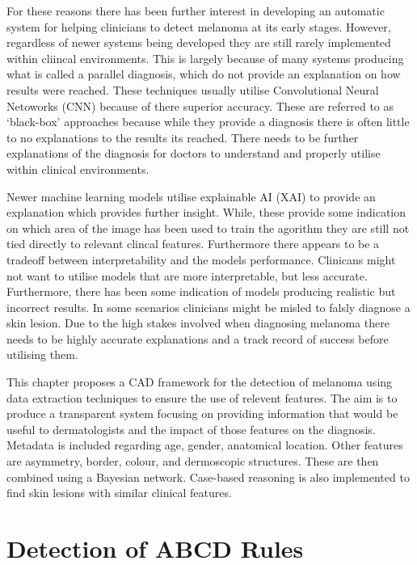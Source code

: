 For these reasons there has been further interest in developing an automatic system for helping clinicians to detect melanoma at its early stages. However, regardless of newer systems being developed they are still rarely implemented within cliincal environments. This is largely because of many systems producing what is called a parallel diagnosis, which do not provide an explanation on how results were reached. These techniques usually utilise Convolutional Neural Netoworks (CNN) because of there superior accuracy\cite{}. These are referred to as `black-box' approaches because while they provide a diagnosis there is often little to no explanations to the results its reached. There needs to be further explanations of the diagnosis for doctors to understand and properly utilise within clinical environments. 

Newer machine learning models utilise explainable AI (XAI) to provide an explanation which provides further insight. While, these provide some indication on which area of the image has been used to train the agorithm they are still not tied directly to relevant clincal features. Furthermore there appears to be a tradeoff between interpretability and the models performance. Clinicans might not want to utilise models that are more interpretable, but less accurate. Furthermore, there has been some indication of models producing realistic but incorrect results. In some scenarios clinicians might be misled to falsly diagnose a skin lesion. Due to the high stakes involved when diagnosing melanoma there needs to be highly accurate explanations and a track record of success before utilising them.

This chapter proposes a CAD framework for the detection of melanoma using data extraction techniques to ensure the use of relevent features. The aim is to produce a transparent system focusing on providing information that would be useful to dermatologists and the impact of those features on the diagnosis. Metadata is included regarding age, gender, anatomical location. Other features are asymmetry, border, colour, and dermoscopic structures. These are then combined using a Bayesian network. Case-based reasoning is also implemented to find skin lesions with similar clinical features.

\section{Detection of ABCD Rules}

